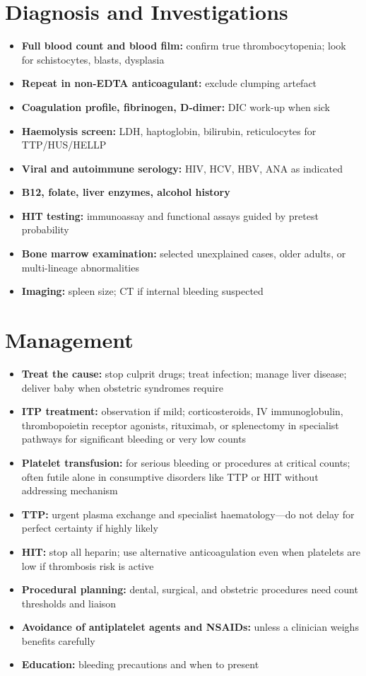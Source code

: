 \section*{Diagnosis and Investigations}
\begin{itemize}
    \item \textbf{Full blood count and blood film:} confirm true thrombocytopenia; look for schistocytes, blasts, dysplasia
    \item \textbf{Repeat in non-EDTA anticoagulant:} exclude clumping artefact
    \item \textbf{Coagulation profile, fibrinogen, D-dimer:} DIC work-up when sick
    \item \textbf{Haemolysis screen:} LDH, haptoglobin, bilirubin, reticulocytes for TTP/HUS/HELLP
    \item \textbf{Viral and autoimmune serology:} HIV, HCV, HBV, ANA as indicated
    \item \textbf{B12, folate, liver enzymes, alcohol history}
    \item \textbf{HIT testing:} immunoassay and functional assays guided by pretest probability
    \item \textbf{Bone marrow examination:} selected unexplained cases, older adults, or multi-lineage abnormalities
    \item \textbf{Imaging:} spleen size; CT if internal bleeding suspected
\end{itemize}

\section*{Management}
\begin{itemize}
    \item \textbf{Treat the cause:} stop culprit drugs; treat infection; manage liver disease; deliver baby when obstetric syndromes require
    \item \textbf{ITP treatment:} observation if mild; corticosteroids, IV immunoglobulin, thrombopoietin receptor agonists, rituximab, or splenectomy in specialist pathways for significant bleeding or very low counts
    \item \textbf{Platelet transfusion:} for serious bleeding or procedures at critical counts; often futile alone in consumptive disorders like TTP or HIT without addressing mechanism
    \item \textbf{TTP:} urgent plasma exchange and specialist haematology---do not delay for perfect certainty if highly likely
    \item \textbf{HIT:} stop all heparin; use alternative anticoagulation even when platelets are low if thrombosis risk is active
    \item \textbf{Procedural planning:} dental, surgical, and obstetric procedures need count thresholds and liaison
    \item \textbf{Avoidance of antiplatelet agents and NSAIDs:} unless a clinician weighs benefits carefully
    \item \textbf{Education:} bleeding precautions and when to present
\end{itemize}


